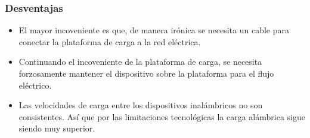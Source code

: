 \documentclass[letterpaper, 12pt]{article}
\begin{document}
\begin{justify}
        \subsubsection{Desventajas}
        \begin{itemize}
            \item El mayor incoveniente es que, de manera irónica se necesita un cable para conectar la plataforma de carga a la red eléctrica.
            \item Continuando el incoveniente de la plataforma de carga, se necesita forzosamente mantener el dispositivo sobre la plataforma para el flujo eléctrico.
            \item Las velocidades de carga entre los dispositivos inalámbricos no son consistentes. Así que por las limitaciones tecnológicas la carga alámbrica sigue siendo muy superior.
        \end{itemize}
    \end{justify}
     
    \newpage
    \printbibliography
\end{document}
